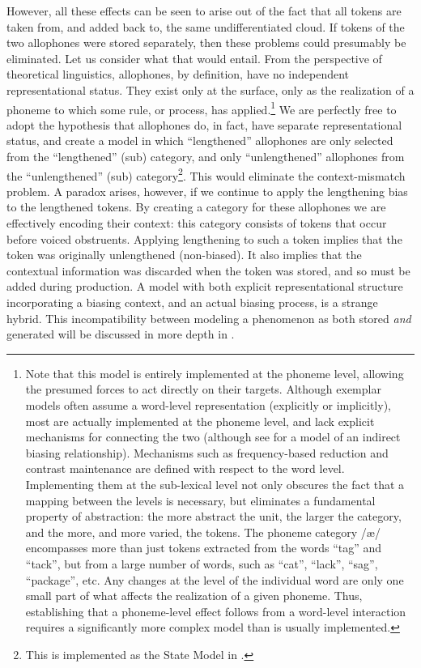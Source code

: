 However, all these effects can be seen to arise out of the fact that
all tokens are taken from, and added back to, the same undifferentiated
cloud. If tokens of the two allophones were stored separately, then
these problems could presumably be eliminated. Let us consider what
that would entail. From the perspective of theoretical linguistics,
allophones, by definition, have no independent representational status.
They exist only at the surface, only as the realization of a phoneme
to which some rule, or process, has applied.\footnote{Note that this model is entirely implemented at the phoneme level,
allowing the presumed forces to act directly on their targets. Although
exemplar models often assume a word-level representation (explicitly
or implicitly), most are actually implemented at the phoneme level,
and lack explicit mechanisms for connecting the two (although see
\citet{Wedel2008} for a model of an indirect biasing relationship).
Mechanisms such as frequency-based reduction and contrast maintenance
are defined with respect to the word level. Implementing them at the
sub-lexical level not only obscures the fact that a mapping between
the levels is necessary, but eliminates a fundamental property of
abstraction: the more abstract the unit, the larger the category,
and the more, and more varied, the tokens. The phoneme category {/æ/}
encompasses more than just tokens extracted from the words “tag”
and “tack”, but from a large number of words, such as “cat”,
“lack”, “sag”, “package”, etc. Any changes at the
level of the individual word are only one small part of what affects
the realization of a given phoneme. Thus, establishing that a phoneme-level
effect follows from a word-level interaction requires a significantly
more complex model than is usually implemented. } We are perfectly free to adopt the hypothesis that allophones do,
in fact, have separate representational status, and create a model
in which “lengthened” allophones are only selected from the
“lengthened” (sub) category, and only “unlengthened” allophones
from the “unlengthened” (sub) category\footnote{This is implemented as the State Model in .}.
This would eliminate the context-mismatch problem. A paradox arises,
however, if we continue to apply the lengthening bias to the lengthened
tokens. By creating a category for these allophones we are effectively
encoding their context: this category consists of tokens that occur
before voiced obstruents. Applying lengthening to such a token implies
that the token was originally unlengthened (non-biased). It also implies
that the contextual information was discarded when the token was stored,
and so must be added during production. A model with both explicit
representational structure incorporating a biasing context, and an
actual biasing process, is a strange hybrid. This incompatibility
between modeling a phenomenon as both stored \emph{and} generated
will be discussed in more depth in . 

